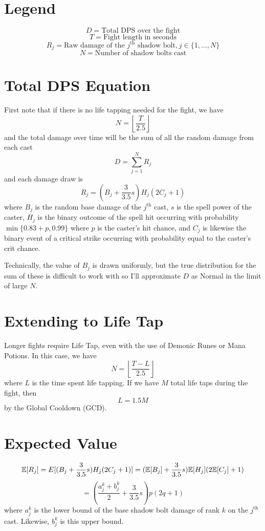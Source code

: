 
\section*{Legend}
$$
D = \text{Total DPS over the fight}
$$
$$
T = \text{Fight length in seconds}
$$
$$
R_j = \text{Raw damage of the $j^\text{th}$ shadow bolt,} \ j \in \{ 1, ..., N \}
$$
$$
N = \text{Number of shadow bolts cast}
$$


\section*{Total DPS Equation}
%
First note that if there is no life tapping needed for the fight, we have
%
$$
N = \left\lfloor \frac{T}{2.5} \right\rfloor
$$
%
and the total damage over time will be the sum of all the random damage from each cast
%
$$
D = \sum_{j=1}^N R_j
$$
%
and each damage draw is
%
$$
R_j = (B_j + \frac{3}{3.5} s) H_j (2 C_j + 1)
$$
%
where $B_j$ is the random base damage of the $j^\text{th}$ cast, $s$ is the spell power of the caster, $H_j$ is the binary outcome of the spell hit occurring with probability $\min \{ 0.83 + p, 0.99 \}$ where $p$ is the caster's hit chance, and $C_j$ is likewise the binary event of a critical strike occurring with probability equal to the caster's crit chance.

Technically, the value of $B_j$ is drawn uniformly, but the true distribution for the sum of these is difficult to work with so I'll approximate $D$ as Normal in the limit of large $N$.



\section*{Extending to Life Tap}
%
Longer fights require Life Tap, even with the use of Demonic Runes or Mana Potions. In this case, we have
%
$$
N = \left\lfloor \frac{T-L}{2.5} \right\rfloor
$$
%
where $L$ is the time spent life tapping. If we have $M$ total life taps during the fight, then
%
$$
L = 1.5 M
$$
%
by the Global Cooldown (GCD).



\section*{Expected Value}
%
$$
\mathbb{E}[R_j] = E[(B_j + \frac{3}{3.5} s) H_j (2 C_j + 1)]
= (\mathbb{E}[B_j] + \frac{3}{3.5} s) \mathbb{E}[H_j] (2 \mathbb{E}[C_j] + 1)
$$
$$
= (\frac{a_j^k + b_j^k}{2} + \frac{3}{3.5} s) p (2 q + 1)
$$
%
where $a_j^k$ is the lower bound of the base shadow bolt damage of rank $k$ on the $j^\text{th}$ cast. Likewise, $b_j^k$ is this upper bound.
